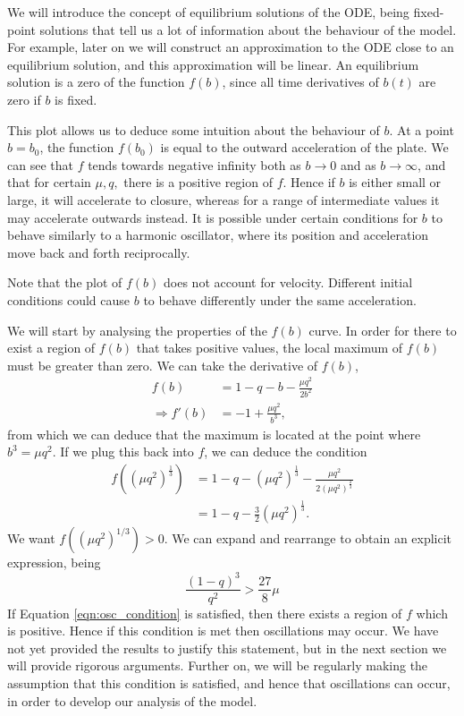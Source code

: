 \documentclass{article}
\begin{document}
We will introduce the concept of equilibrium solutions of the ODE,
being fixed-point solutions that tell us a lot of information about the behaviour of the model.
For example, later on we will construct an approximation to the ODE close to an equilibrium solution,
and this approximation will be linear.
An equilibrium solution is a zero of the function \(f(b)\), since all time derivatives of \(b(t)\) are zero if \(b\) is fixed.

This plot allows us to deduce some intuition about the behaviour of $b$.
At a point $b=b_0$, the function $f(b_0)$ is equal to the outward acceleration of the plate.
We can see that $f$ tends towards negative infinity both as $b\rightarrow 0$ and as $b\rightarrow\infty$,
and that for certain $\mu, q,$ there is a positive region of $f$.
Hence if $b$ is either small or large, it will accelerate to closure,
whereas for a range of intermediate values it may accelerate outwards instead.
It is possible under certain conditions for $b$ to behave similarly to a harmonic oscillator,
where its position and acceleration move back and forth reciprocally.

Note that the plot of $f(b)$ does not account for velocity.
Different initial conditions could cause $b$ to behave differently under the same acceleration.

We will start by analysing the properties of the $f(b)$ curve.
In order for there to exist a region of $f(b)$ that takes positive values,
the local maximum of $f(b)$ must be greater than zero.
We can take the derivative of $f(b)$,
\begin{align}
    f(b)              & = 1 - q - b - \frac{\mu q^2}{2b^2} \\
    \Rightarrow f'(b) & = -1 + \frac{\mu q^2}{b^3},
\end{align}
from which we can deduce that the maximum is located at the point where $b^3 = \mu q^2$.
If we plug this back into $f$, we can deduce the condition
\begin{align}
    f((\mu q^2)^{\frac{1}{3}}) & = 1 - q - (\mu q^2)^{\frac{1}{3}} - \frac{\mu q^2}{2(\mu q^2)^{\frac{2}{3}}} \\
                               & = 1 - q - \frac{3}{2}(\mu q^2)^{\frac{1}{3}}.
\end{align}
We want \(f((\mu q^2)^{1/3}) > 0 \). We can expand and rearrange to obtain an explicit expression, being
\begin{equation}
    \frac{(1-q)^3}{q^2} > \frac{27}{8}\mu
    \label{eqn:osc_condition}
\end{equation}
If Equation \ref{eqn:osc_condition} is satisfied,
then there exists a region of $f$ which is positive.
Hence if this condition is met then oscillations may occur. %
We have not yet provided the results to justify this statement, but in the next section we will provide rigorous arguments. %
Further on, we will be regularly making the assumption that this condition is satisfied,
and hence that oscillations can occur,
in order to develop our analysis of the model.
\end{document}

